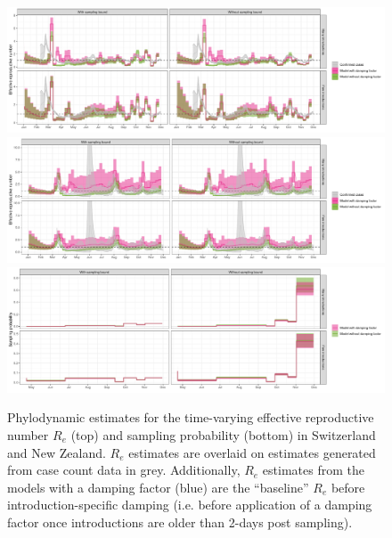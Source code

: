 \documentclass[9pt,twoside,lineno]{pnas-new}
\begin{document}
\begin{figure}[tbhp]
\centering
\includegraphics[width=\linewidth]{figures/CHE_Re.pdf}
\includegraphics[width=\linewidth]{figures/NZL_Re.pdf}
\vfill
\includegraphics[width=\linewidth]{figures/CHE_sampProp.pdf}
\caption{Phylodynamic estimates for the time-varying effective reproductive number $R_e$ (top) and sampling probability (bottom) in Switzerland and New Zealand. $R_e$ estimates are overlaid on estimates generated from case count data \cite{huisman_re_preprint} in grey. Additionally, $R_e$ estimates from the models with a damping factor (blue) are the ``baseline'' $R_e$ before introduction-specific damping (i.e. before application of a damping factor once introductions are older than 2-days post sampling).}  
\label{fig:ReSampProbResults}
\end{figure}
\end{document}
